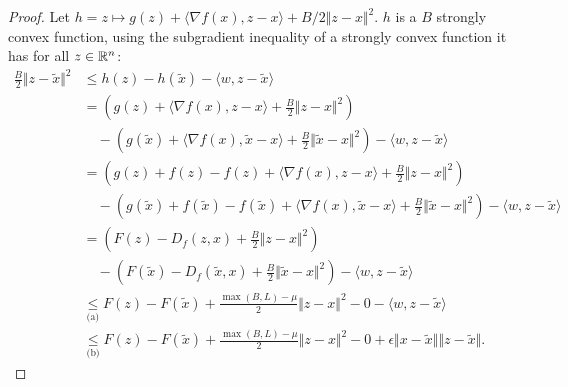 \documentclass[12pt]{article}
\begin{document}
        \begin{proof}
            Let $h = z \mapsto g(z) + \langle \nabla f(x), z - x\rangle + B/2\Vert z - x\Vert^2$. 
            $h$ is a $B$ strongly convex function, using the subgradient inequality of a strongly convex function it has for all $z \in \mathbb R^n$: 
            \begin{align*}
                \frac{B}{2}\Vert z - \tilde x\Vert^2
                &\le h(z) - h(\tilde x) - \langle w, z - \tilde x\rangle
                \\
                &= 
                \left(
                    g(z) + \langle \nabla f(x), z - x\rangle + \frac{B}{2}\Vert z - x\Vert^2
                \right)
                \\ &\quad 
                    - 
                    \left(
                        g(\tilde x) + \langle \nabla f(x), \tilde x - x\rangle + \frac{B}{2}\Vert \tilde x - x\Vert^2
                    \right)
                    - \langle w, z - \tilde x\rangle
                \\
                &= \left(
                    g(z) + f(z) - f(z) + \langle \nabla f(x), z - x\rangle + \frac{B}{2}\Vert z - x\Vert^2
                \right)
                \\ &\quad 
                    - 
                    \left(
                        g(\tilde x) + f(\tilde x) - f(\tilde x) 
                        + \langle \nabla f(x), \tilde x - x\rangle + \frac{B}{2}\Vert \tilde x - x\Vert^2
                    \right)
                    - \langle w, z - \tilde x\rangle
                \\
                &= \left(
                    F(z) - D_f(z, x) + \frac{B}{2}\Vert z - x\Vert^2
                \right)
                \\ &\quad 
                    - 
                    \left(
                        F(\tilde x) - D_f(\tilde x, x) + \frac{B}{2}\Vert \tilde x - x\Vert^2
                    \right)
                    - \langle w, z - \tilde x\rangle
                \\
                &\underset{\text{(a)}}{\le} F(z) - F(\tilde x) + \frac{\max(B, L) - \mu}{2}\Vert z - x\Vert^2 - 0 - \langle w, z - \tilde x \rangle
                \\
                &\underset{\text{(b)}}{\le}
                F(z) - F(\tilde x) + \frac{\max(B, L) - \mu}{2}\Vert z - x\Vert^2 - 0 + \epsilon \Vert x - \tilde x\Vert\Vert z - \tilde x\Vert. 
            \end{align*}

\end{proof}
\end{document}
